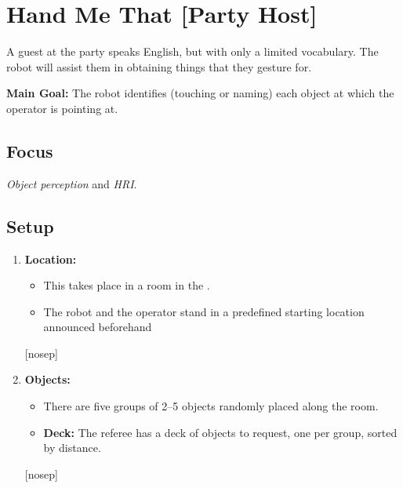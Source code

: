 \section{Hand Me That [Party Host]}
\label{test:hand-me-that}
A guest at the party speaks English, but with only a limited vocabulary. The robot will assist them in obtaining things that they gesture for.



\noindent \textbf{Main Goal:} The robot identifies (touching or naming) each object at which the operator is pointing at.

\subsection*{Focus}
\emph{Object perception} and \emph{HRI}.


%
%
\subsection*{Setup}
\begin{enumerate}[nosep]
	\item \textbf{Location:} 
	\begin{itemize}[nosep]
		\item This takes place in a room in the \Arena{}.
		\item The robot and the operator stand in a predefined starting location announced beforehand %
	\end{itemize}[nosep]
	
	\item \textbf{Objects:} 
		\begin{itemize}[nosep] 
		\item {}There are five groups of 2--5 objects randomly placed along the room.
		\item \textbf{Deck:} The referee has a deck of objects to request, one per group, sorted by distance.
		\end{itemize}[nosep]

\end{enumerate}


